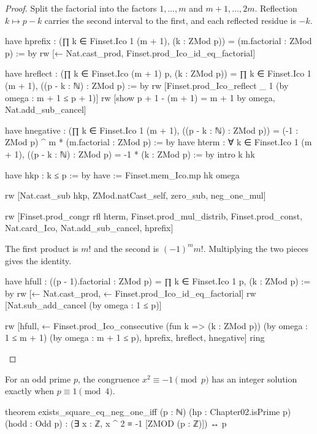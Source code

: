 \begin{proof}
  Split the factorial into the factors $1,\ldots,m$ and $m+1,\ldots,2m$.
  Reflection $k\mapsto p-k$ carries the second interval to the first, and each reflected residue is
  $-k$.

  \begin{lean}
    have hprefix : (∏ k ∈ Finset.Ico 1 (m + 1), (k : ZMod p)) = (m.factorial : ZMod p) := by
      rw [← Nat.cast_prod, Finset.prod_Ico_id_eq_factorial]

    have hreflect : (∏ k ∈ Finset.Ico (m + 1) p, (k : ZMod p)) =
        ∏ k ∈ Finset.Ico 1 (m + 1), ((p - k : ℕ) : ZMod p) := by
      rw [Finset.prod_Ico_reflect _ 1 (by omega : m + 1 ≤ p + 1)]
      rw [show p + 1 - (m + 1) = m + 1 by omega, Nat.add_sub_cancel]

    have hnegative : (∏ k ∈ Finset.Ico 1 (m + 1), ((p - k : ℕ) : ZMod p)) =
        (-1 : ZMod p) ^ m * (m.factorial : ZMod p) := by
      have hterm : ∀ k ∈ Finset.Ico 1 (m + 1), ((p - k : ℕ) : ZMod p) = -1 * (k : ZMod p) := by
        intro k hk

        have hkp : k ≤ p := by
          have := Finset.mem_Ico.mp hk
          omega

        rw [Nat.cast_sub hkp, ZMod.natCast_self, zero_sub, neg_one_mul]

      rw [Finset.prod_congr rfl hterm, Finset.prod_mul_distrib, Finset.prod_const,
        Nat.card_Ico, Nat.add_sub_cancel, hprefix]
  \end{lean}

  The first product is $m!
  $ and the second is $(-1)^m m!$.
  Multiplying the two pieces gives the identity.

  \begin{lean}
    have hfull : ((p - 1).factorial : ZMod p) = ∏ k ∈ Finset.Ico 1 p, (k : ZMod p) := by
      rw [← Nat.cast_prod, ← Finset.prod_Ico_id_eq_factorial]
      rw [Nat.sub_add_cancel (by omega : 1 ≤ p)]

    rw [hfull, ← Finset.prod_Ico_consecutive (fun k => (k : ZMod p))
      (by omega : 1 ≤ m + 1) (by omega : m + 1 ≤ p), hprefix, hreflect, hnegative]
    ring
  \end{lean}
\end{proof}

\begin{theorem}
  \label{ent:thm:exists-square-eq-neg-one-iff}
  For an odd prime $p$, the congruence $x^2\equiv-1\pmod p$ has an integer solution exactly when
  $p\equiv1\pmod4$.

  \begin{lean}
    theorem exists_square_eq_neg_one_iff (p : ℕ) (hp : Chapter02.isPrime p) (hodd : Odd p) :
        (∃ x : ℤ, x ^ 2 ≡ -1 [ZMOD (p : ℤ)]) ↔ p %
  \end{lean}
\end{theorem}


